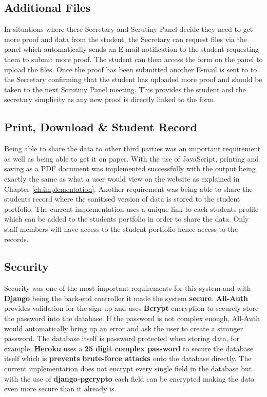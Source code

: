 \documentclass[../main.tex]{subfiles}
\begin{document}
\subsection*{Additional Files}
In situations where there Secretary and Scrutiny Panel decide they need to get more proof and data from the student, the Secretary can request files via the panel which automatically sends an E-mail notification to the student requesting them to submit more proof. The student can then access the form on the panel to upload the files. Once the proof has been submitted another E-mail is sent to to the Secretary confirming that the student has uploaded more proof and should be taken to the next Scrutiny Panel meeting. This provides the student and the secretary simplicity as any new proof is directly linked to the form. 
\subsection*{Print, Download \& Student Record}
Being able to share the data to other third parties was an important requirement as well as being able to get it on paper. With the use of JavaScript, printing and saving as a PDF document was implemented successfully with the output being exactly the same as what a user would view on the website as explained in Chapter \ref{ch:implementation}. Another requirement was being able to share the students record where the sanitised version of data is stored to the student portfolio. The current implementation uses a unique link to each students profile which can be added to the students portfolio in order to share the data. Only staff members will have access to the student portfolio hence access to the records.
\subsection*{Security}  
Security was one of the most important requirements for this system and with \textbf{Django} being the back-end controller it made the system \textbf{secure}. \textbf{All-Auth}\cite{allauth} provides validation for the sign up and uses \textbf{Bcrypt}\cite{bcrypt} encryption to securely store the password into the database. If the password is not complex enough, All-Auth would automatically bring up an error and ask the user to create a stronger password. The database itself is password protected when storing data, for example, \textbf{Heroku} uses a \textbf{25 digit complex password} to secure the database itself which is \textbf{prevents} \textbf{brute-force attacks} onto the database directly. The current implementation does not encrypt every single field in the database but with the use of \textbf{django-pgcrypto}\cite{dbencrypt} each field can be encrypted making the data even more secure than it already is. \\[4mm]
\end{document}
